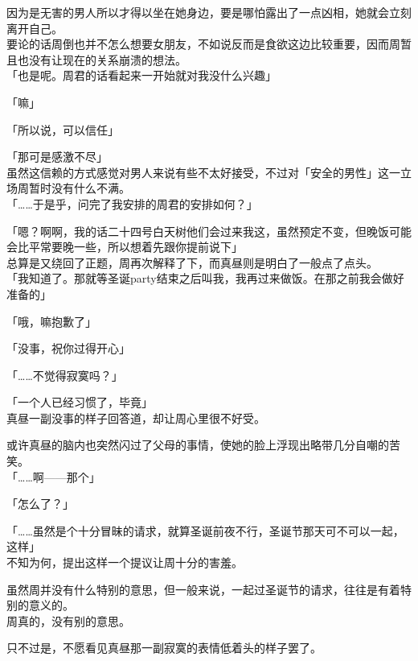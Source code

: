 因为是无害的男人所以才得以坐在她身边，要是哪怕露出了一点凶相，她就会立刻离开自己。\\

要论的话周倒也并不怎么想要女朋友，不如说反而是食欲这边比较重要，因而周暂且也没有让现在的关系崩溃的想法。\\

「也是呢。周君的话看起来一开始就对我没什么兴趣」

「嘛」

「所以说，可以信任」

「那可是感激不尽」\\

虽然这信赖的方式感觉对男人来说有些不太好接受，不过对「安全的男性」这一立场周暂时没有什么不满。\\

「……于是乎，问完了我安排的周君的安排如何？」

「嗯？啊啊，我的话二十四号白天树他们会过来我这，虽然预定不变，但晚饭可能会比平常要晚一些，所以想着先跟你提前说下」\\

总算是又绕回了正题，周再次解释了下，而真昼则是明白了一般点了点头。\\

「我知道了。那就等圣诞party结束之后叫我，我再过来做饭。在那之前我会做好准备的」

「哦，嘛抱歉了」

「没事，祝你过得开心」

「……不觉得寂寞吗？」

「一个人已经习惯了，毕竟」\\

真昼一副没事的样子回答道，却让周心里很不好受。

或许真昼的脑内也突然闪过了父母的事情，使她的脸上浮现出略带几分自嘲的苦笑。\\

「……啊——那个」

「怎么了？」

「……虽然是个十分冒昧的请求，就算圣诞前夜不行，圣诞节那天可不可以一起，这样」\\

不知为何，提出这样一个提议让周十分的害羞。

虽然周并没有什么特别的意思，但一般来说，一起过圣诞节的请求，往往是有着特别的意义的。\\

周真的，没有别的意思。

只不过是，不愿看见真昼那一副寂寞的表情低着头的样子罢了。\\

